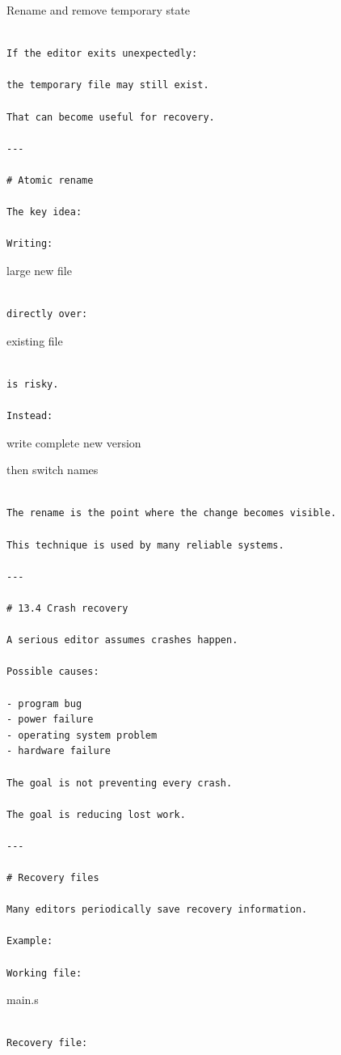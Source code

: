 \documentclass[
  oneside,
  openany]{book}
\begin{document}
Rename and remove temporary state

\begin{verbatim}

If the editor exits unexpectedly:

the temporary file may still exist.

That can become useful for recovery.

---

# Atomic rename

The key idea:

Writing:
\end{verbatim}

large new file

\begin{verbatim}

directly over:
\end{verbatim}

existing file

\begin{verbatim}

is risky.

Instead:
\end{verbatim}

write complete new version

then switch names

\begin{verbatim}

The rename is the point where the change becomes visible.

This technique is used by many reliable systems.

---

# 13.4 Crash recovery

A serious editor assumes crashes happen.

Possible causes:

- program bug
- power failure
- operating system problem
- hardware failure

The goal is not preventing every crash.

The goal is reducing lost work.

---

# Recovery files

Many editors periodically save recovery information.

Example:

Working file:
\end{verbatim}

main.s

\begin{verbatim}

Recovery file:
\end{verbatim}
\end{document}
